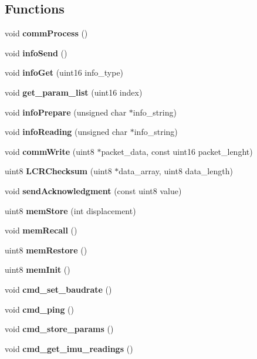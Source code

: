 \subsection*{Functions}
\begin{DoxyCompactItemize}
\item 
\mbox{\label{command__processing_8c_a2e5d1711e19837adc3e8f479af3ae509}} 
void {\bfseries comm\+Process} ()
\item 
\mbox{\label{command__processing_8c_af5dcf9e6d2a6421fbe636487e7f9f240}} 
void {\bfseries info\+Send} ()
\item 
\mbox{\label{command__processing_8c_a525ccbc7ac3901d938dc352172ee2531}} 
void {\bfseries info\+Get} (uint16 info\+\_\+type)
\item 
\mbox{\label{command__processing_8c_a5ef086c932682ca5f7549b74ead732aa}} 
void {\bfseries get\+\_\+param\+\_\+list} (uint16 index)
\item 
\mbox{\label{command__processing_8c_abacf855ed80e3052a5bb5b243a0d809e}} 
void {\bfseries info\+Prepare} (unsigned char $\ast$info\+\_\+string)
\item 
\mbox{\label{command__processing_8c_a6762f8be034e0cc6e89e468480242a98}} 
void {\bfseries info\+Reading} (unsigned char $\ast$info\+\_\+string)
\item 
\mbox{\label{command__processing_8c_a49ef41d195291783b6c0e25a0da21a84}} 
void {\bfseries comm\+Write} (uint8 $\ast$packet\+\_\+data, const uint16 packet\+\_\+lenght)
\item 
\mbox{\label{command__processing_8c_a6205a6e88f72f4cc321a7d8abca23e26}} 
uint8 {\bfseries L\+C\+R\+Checksum} (uint8 $\ast$data\+\_\+array, uint8 data\+\_\+length)
\item 
\mbox{\label{command__processing_8c_af4a42b25376d2efd09096cbbed2fbce4}} 
void {\bfseries send\+Acknowledgment} (const uint8 value)
\item 
uint8 \textbf{ mem\+Store} (int displacement)
\item 
void \textbf{ mem\+Recall} ()
\item 
uint8 \textbf{ mem\+Restore} ()
\item 
uint8 \textbf{ mem\+Init} ()
\item 
void \textbf{ cmd\+\_\+set\+\_\+baudrate} ()
\item 
\mbox{\label{command__processing_8c_a704f8c8cb0f4d75f243fc2b79bc34188}} 
void {\bfseries cmd\+\_\+ping} ()
\item 
\mbox{\label{command__processing_8c_a1a2493bfc2f30171d7e7a3bd5aebab14}} 
void {\bfseries cmd\+\_\+store\+\_\+params} ()
\item 
\mbox{\label{command__processing_8c_a40f7c67690279132ab72019b76165cb8}} 
void {\bfseries cmd\+\_\+get\+\_\+imu\+\_\+readings} ()
\end{DoxyCompactItemize}
